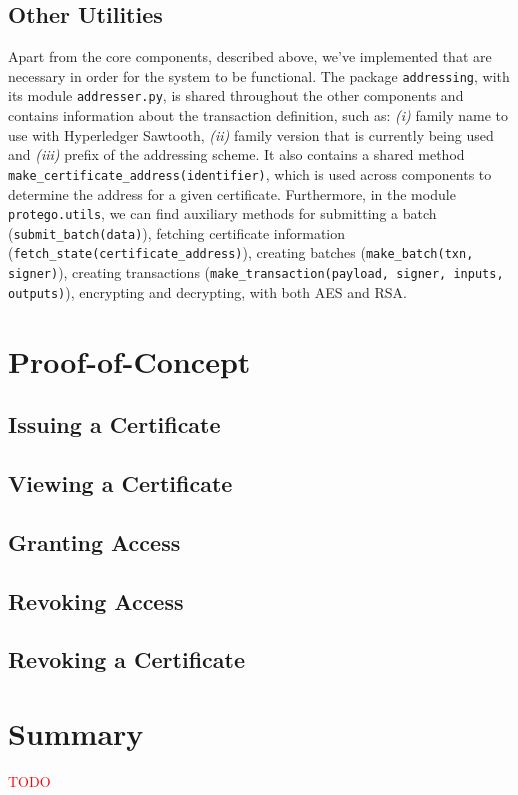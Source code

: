 \subsection{Other Utilities}

Apart from the core components, described above, we've implemented that are necessary in order for the system to be functional. The package \texttt{addressing}, with its module \texttt{addresser.py}, is shared throughout the other components and contains  information about the transaction definition, such as: \emph{(i)} family name to use with Hyperledger Sawtooth, \emph{(ii)} family version that is currently being used and \emph{(iii)} prefix of the addressing scheme. It also contains a shared method \texttt{make\_certificate\_address(identifier)}, which is used across components to determine the address for a given certificate. Furthermore, in the module \texttt{protego.utils}, we can find auxiliary methods for submitting a batch (\texttt{submit\_batch(data)}), fetching certificate information (\texttt{fetch\_state(certificate\_address)}), creating batches (\texttt{make\_batch(txn, signer)}), creating transactions (\texttt{make\_transaction(payload, signer, inputs, outputs)}), encrypting and decrypting, with both AES and RSA.

\section{Proof-of-Concept}
\label{sec:implementation-poc}

\subsection{Issuing a Certificate}

\subsection{Viewing a Certificate}

\subsection{Granting Access}

\subsection{Revoking Access}

\subsection{Revoking a Certificate}

\section{Summary}

\textcolor{red}{TODO}
